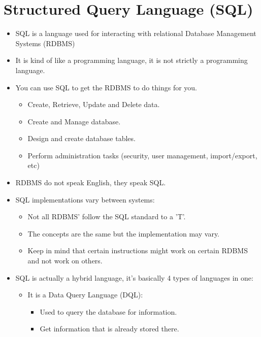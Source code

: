 \section{Structured Query Language (SQL)}
\begin{itemize}
    \item SQL is a language used for interacting with relational Database Management Systems (RDBMS)
    \item It is kind of like a programming language, it is not strictly a programming language.
    \item You can use SQL to get the RDBMS to do things for you.
        \begin{itemize}
            \item Create, Retrieve, Update and Delete data.
            \item Create and Manage database.
            \item Design and create database tables.
            \item Perform administration tasks (security, user management, import/export, etc)
        \end{itemize}
    
    \item RDBMS do not speak English, they speak SQL.
    \item SQL implementations vary between systems:
        \begin{itemize}
            \item Not all RDBMS' follow the SQL standard to a 'T'.
            \item The concepts are the same but the implementation may vary.
            \item Keep in mind that certain instructions might work on certain RDBMS and not work on others.
        \end{itemize}
    
    \item SQL is actually a hybrid language, it's basically 4 types of languages in one:
        \begin{itemize}
            \item It is a Data Query Language (DQL):
                \begin{itemize}
                    \item Used to query the database for information.
                    \item Get information that is already stored there.
                \end{itemize}
            

\end{itemize}
\end{itemize}
